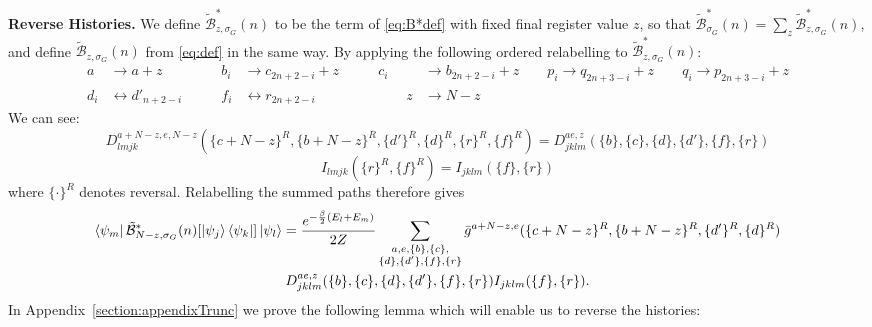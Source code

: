 \documentclass[aps,floatfix,10pt,amssymb,amsfont,amsmath,superscriptaddress,float,nofootinbib,longbibliography,nobalancelastpage,twocolumn]{revtex4-2}
\begin{document}
\textbf{Reverse Histories.} We define $\tilde{\mathcal{B}}^*_{z,\sigma_G}(n)$ to be the term of \eqref{eq:B*def} with fixed final register value $z$, so that $\tilde{\mathcal{B}}^*_{\sigma_G}(n) = \sum_z \tilde{\mathcal{B}}^*_{z,\sigma_G}(n)$, and define $\tilde{\mathcal{B}}_{z,\sigma_G}(n)$ from \eqref{eq:def} in the same way. By applying the following ordered relabelling to $\tilde{\mathcal{B}}^*_{z,\sigma_G}(n)$:
\begin{align}
    a &\rightarrow a+ z &\qquad b_i &\rightarrow c_{2n+2-i} + z\qquad& c_i &\rightarrow b_{2n+2-i} + z  \qquad p_i \rightarrow q_{2n+3-i}+z \qquad q_i \rightarrow p_{2n+3-i} +z\\   d_i &\leftrightarrow d'_{n+2-i} &\qquad f_i &\leftrightarrow r_{2n+2-i} &\qquad z &\rightarrow N -z
\end{align}
We can see:
\begin{equation*}
   D^{a+N-z,e,N-z}_{lmjk}(\{c+N-z\}^R,\{b+N-z\}^R,\{d'\}^R,\{d\}^R,\{r\}^R,\{f\}^R) =  D^{ae,z}_{jklm}(\{b\},\{c\},\{d\},\{d'\},\{f\},\{r\})
\end{equation*}
\begin{equation*}
    I_{lmjk}(\{r\}^R,\{f\}^R) = I_{jklm}(\{f\},\{r\})
\end{equation*}
where $\{\cdot\}^R$ denotes reversal.
Relabelling the summed paths therefore gives
\begin{multline}
     \bra{\psi_m}\tilde{\mathcal{B}}^*_{N-z,\sigma_G}(n)[\ket{\psi_j}\bra{\psi_k}]\ket{\psi_l} = \frac{e^{-\frac{\beta}{2}(E_l+E_m)}}{2Z}\sum_{\substack{a,e,\{b\},\{c\},\\\{d\},\{d'\},\{f\},\{r\}}} \bar g^{a+N -z,e}(\{c+N -z\}^R,\{b+N -z\}^R,\{d'\}^R,\{d\}^R) 
     \\D^{ae,z}_{jklm}(\{b\},\{c\},\{d\},\{d'\},\{f\},\{r\})I_{jklm}(\{f\},\{r\}).
     \label{eq:relabelline}
\end{multline}
In Appendix~\ref{section:appendixTrunc} we prove the following lemma which will enable us to reverse the histories:
\end{document}
